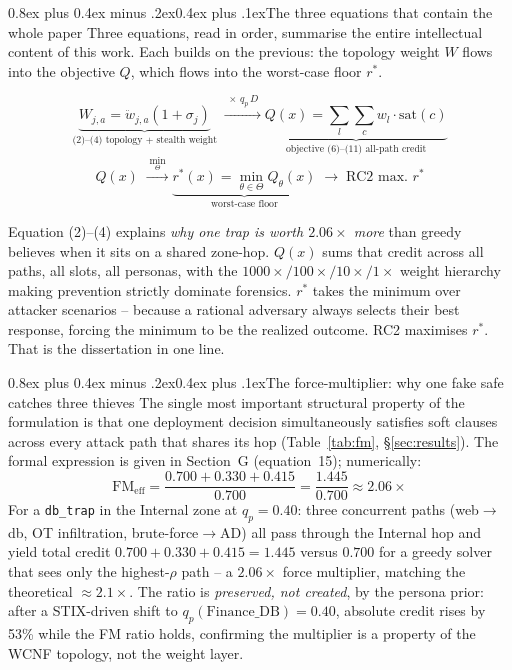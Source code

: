 \documentclass[10pt,twocolumn]{article}
\makeatletter
\renewcommand{\subsection}{\@startsection{subsection}{2}{0pt}%
  {0.8ex plus 0.4ex minus .2ex}{0.4ex plus .1ex}{\normalfont\bfseries}}
\makeatother
\begin{document}
\subsection{The three equations that contain the whole paper}
Three equations, read in order, summarise the entire intellectual content of this work.
Each builds on the previous: the topology weight $W$ flows into the objective $Q$, which flows into the worst-case floor $r^*$.

\begin{equation*}
\underbrace{W_{j,a}=\ddot{w}_{j,a}(1+\sigma_j)}_{\text{(2)--(4) topology + stealth weight}}
\;\xrightarrow{\;\times\,q_p\,D\;}
\underbrace{Q(x)=\textstyle\sum_l\sum_c w_l\cdot\mathrm{sat}(c)}_{\text{objective (6)--(11) all-path credit}}
\end{equation*}
\begin{equation*}
Q(x)
\;\xrightarrow{\;\min_{\Theta}\;}
\underbrace{r^*(x)=\min_{\theta\in\Theta}Q_\theta(x)}_{\text{worst-case floor}}
\;\to\;
\text{RC2 max.\ }r^*
\end{equation*}

Equation (2)--(4) explains \emph{why one trap is worth $2.06\times$ more} than greedy believes when it sits on a shared zone-hop. $Q(x)$ sums that credit across all paths, all slots, all personas, with the $1000\times/100\times/10\times/1\times$ weight hierarchy making prevention strictly dominate forensics. $r^*$ takes the minimum over attacker scenarios -- because a rational adversary always selects their best response, forcing the minimum to be the realized outcome. RC2 maximises $r^*$. That is the dissertation in one line.

\subsection{The force-multiplier: why one fake safe catches three thieves}
The single most important structural property of the formulation is that one deployment decision simultaneously satisfies soft clauses across every attack path that shares its hop (Table~\ref{tab:fm}, \S\ref{sec:results}).
The formal expression is given in Section~G (equation~15); numerically:
\[
\mathrm{FM}_{\mathrm{eff}} = \frac{0.700+0.330+0.415}{0.700} = \frac{1.445}{0.700} \approx 2.06\times
\]
For a \texttt{db\_trap} in the Internal zone at $q_p{=}0.40$: three concurrent paths (web$\to$db, OT infiltration, brute-force$\to$AD) all pass through the Internal hop and yield total credit $0.700{+}0.330{+}0.415{=}1.445$ versus $0.700$ for a greedy solver that sees only the highest-$\rho$ path -- a $2.06\times$ force multiplier, matching the theoretical $\approx2.1\times$. The ratio is \emph{preserved, not created}, by the persona prior: after a STIX-driven shift to $q_p(\text{Finance\_DB}){=}0.40$, absolute credit rises by 53\% while the FM ratio holds, confirming the multiplier is a property of the WCNF topology, not the weight layer.
\end{document}
